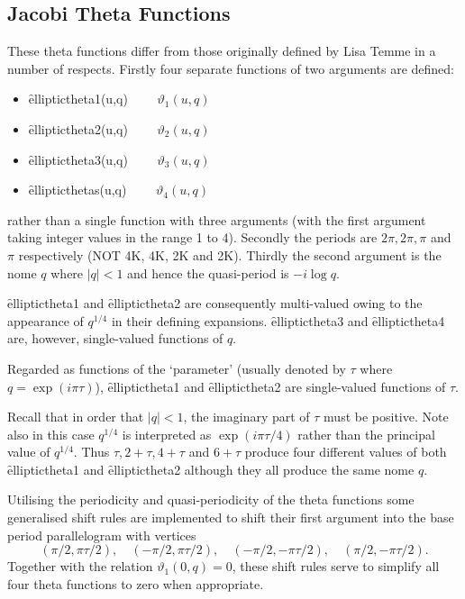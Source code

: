 \subsection{Jacobi Theta Functions}
\hypertarget{JACTF}{}
These theta functions differ from those originally defined by Lisa Temme
in a number of respects.
Firstly four separate functions of two arguments are defined:
\hypertarget{operator:EllipticTheta1}{}
\hypertarget{operator:EllipticTheta2}{}
\hypertarget{operator:EllipticTheta3}{}
\hypertarget{operator:EllipticTheta4}{}
 
 
\begin{itemize}
\item \f{elliptictheta1(u,q)} $\qquad \vartheta_1(u, q)$
\item \f{elliptictheta2(u,q)} $\qquad \vartheta_2(u, q)$
\item \f{elliptictheta3(u,q)} $\qquad \vartheta_3(u, q)$
\item \f{ellipticthetas(u,q)} $\qquad \vartheta_4(u, q)$
\end{itemize}

rather than a single function with three arguments (with the first argument
taking integer values in the range 1 to 4).
Secondly the periods are $2\pi, 2\pi, \pi$ and $\pi$ respectively 
(NOT 4K, 4K, 2K and 2K).
Thirdly the second argument is the nome $q$ where $|q| < 1$ and hence
the quasi-period is $-i\log q$.

\f{elliptictheta1} and \f{elliptictheta2} are consequently multi-valued
owing to the appearance of $q^{1/4}$ in their defining expansions.
\f{elliptictheta3} and \f{elliptictheta4} are, however, single-valued
functions of $q$.

Regarded as functions of the `parameter' (usually denoted by $\tau$ where
$q = \exp(i\pi\tau)$), \f{elliptictheta1} and \f{elliptictheta2} are
single-valued functions of $\tau$. 

Recall that in order that $|q| < 1$, the
imaginary part of $\tau$ must be positive. Note also
 in this case $q^{1/4}$ is interpreted as $\exp(i\pi\tau/4)$ rather than
the principal value of $q^{1/4}$. Thus $\tau, 2+\tau, 4+\tau$ and $6+\tau$
produce four different values of both \f{elliptictheta1} and \f{elliptictheta2}
although they all produce the same nome $q$.

Utilising the periodicity and quasi-periodicity of the theta functions
some generalised shift rules are implemented to shift their first argument
into the base period parallelogram with vertices
$$(\pi/2, \pi\tau/2),\quad (-\pi/2, \pi\tau/2),\quad (-\pi/2, -\pi\tau/2),
\quad (\pi/2, -\pi\tau/2).$$
Together with the relation $\vartheta_1(0,q)=0$, these shift rules serve to
simplify all four theta functions to zero when appropriate.

